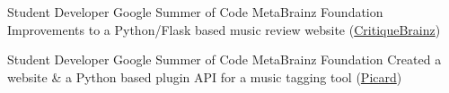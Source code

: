     {Student Developer}
    {Google Summer of Code}
    {MetaBrainz Foundation}
    {}
    {
        Improvements to a Python/Flask based music review website
        (\href{http://critiquebrainz.org/}{CritiqueBrainz})
    }
    \vspace*{0.2\baselineskip}

    {Student Developer}
    {Google Summer of Code}
    {MetaBrainz Foundation}
    {}
    {
        Created a website \& a Python based plugin API for a music tagging tool
        (\href{https://github.com/metabrainz/picard-website/commits?author=dufferzafar}{Picard})
    }
    \vspace*{0.2\baselineskip}
